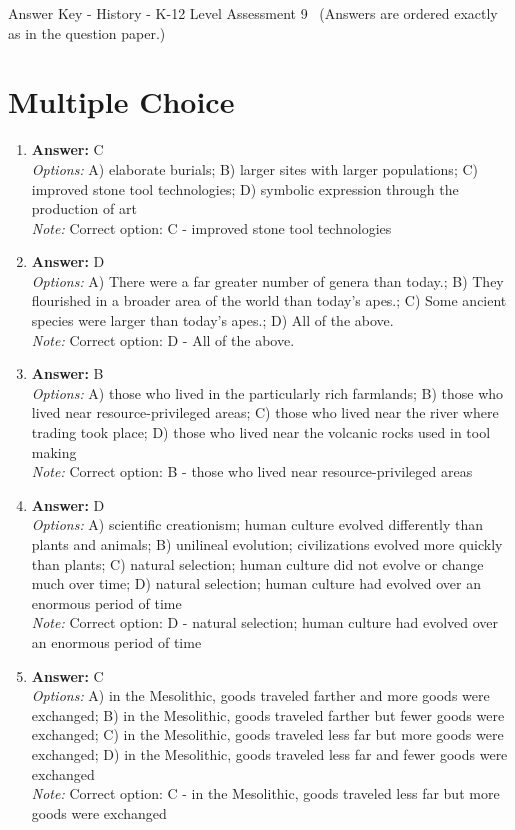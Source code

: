 \documentclass[12pt]{article}
\begin{document}
\begin{center}
Answer Key - History - K-12 Level Assessment 9 \
\small (Answers are ordered exactly as in the question paper.)
\end{center}

\section*{Multiple Choice}
\begin{enumerate}[label=\arabic*.]
\item \textbf{Answer:} C
\\ \textit{Options:} A) elaborate burials; B) larger sites with larger populations; C) improved stone tool technologies; D) symbolic expression through the production of art
\\ \textit{Note:} Correct option: C - improved stone tool technologies
\item \textbf{Answer:} D
\\ \textit{Options:} A) There were a far greater number of genera than today.; B) They flourished in a broader area of the world than today's apes.; C) Some ancient species were larger than today's apes.; D) All of the above.
\\ \textit{Note:} Correct option: D - All of the above.
\item \textbf{Answer:} B
\\ \textit{Options:} A) those who lived in the particularly rich farmlands; B) those who lived near resource-privileged areas; C) those who lived near the river where trading took place; D) those who lived near the volcanic rocks used in tool making
\\ \textit{Note:} Correct option: B - those who lived near resource-privileged areas
\item \textbf{Answer:} D
\\ \textit{Options:} A) scientific creationism; human culture evolved differently than plants and animals; B) unilineal evolution; civilizations evolved more quickly than plants; C) natural selection; human culture did not evolve or change much over time; D) natural selection; human culture had evolved over an enormous period of time
\\ \textit{Note:} Correct option: D - natural selection; human culture had evolved over an enormous period of time
\item \textbf{Answer:} C
\\ \textit{Options:} A) in the Mesolithic, goods traveled farther and more goods were exchanged; B) in the Mesolithic, goods traveled farther but fewer goods were exchanged; C) in the Mesolithic, goods traveled less far but more goods were exchanged; D) in the Mesolithic, goods traveled less far and fewer goods were exchanged
\\ \textit{Note:} Correct option: C - in the Mesolithic, goods traveled less far but more goods were exchanged
\end{enumerate}
\end{document}
